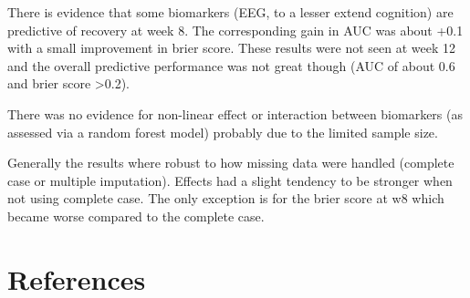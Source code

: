 \documentclass[12pt]{article}
\begin{document}
There is evidence that some biomarkers (EEG, to a lesser extend
cognition) are predictive of recovery at week 8. The corresponding
gain in AUC was about +0.1 with a small improvement in brier
score. These results were not seen at week 12 and the overall
predictive performance was not great though (AUC of about 0.6 and
brier score >0.2).

\bigskip

There was no evidence for non-linear effect or interaction between
biomarkers (as assessed via a random forest model) probably due to the
limited sample size.

\bigskip

Generally the results where robust to how missing data were handled
  (complete case or multiple imputation). Effects had a slight
  tendency to be stronger when not using complete case. The only
  exception is for the brier score at w8 which became worse compared
  to the complete case.  \bigskip


\section{References}
\label{sec:org27e8ebd}
\begingroup
\renewcommand{\section}[2]{}



\endgroup
\end{document}
